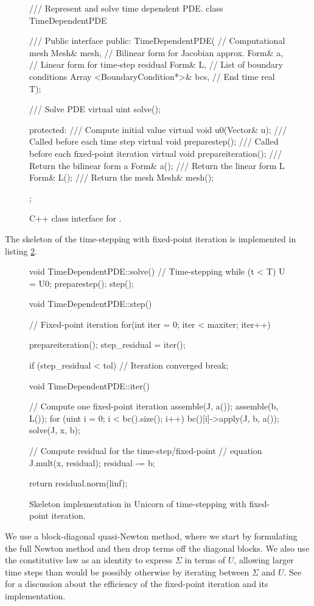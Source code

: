 \begin{figure}
\bwfig
\begin{c++}
/// Represent and solve time dependent PDE.
class TimeDependentPDE
{
  /// Public interface
public:
  TimeDependentPDE(
   // Computational mesh
   Mesh& mesh,
   // Bilinear form for Jacobian approx.
   Form& a,
   // Linear form for time-step residual
   Form& L,
   // List of boundary conditions
   Array <BoundaryCondition*>& bcs,
   // End time
   real T);

  /// Solve PDE
  virtual uint solve();

protected:
  /// Compute initial value
  virtual void u0(Vector& u);
  /// Called before each time step
  virtual void preparestep();
  /// Called before each fixed-point iteration
  virtual void prepareiteration();
  /// Return the bilinear form a
  Form& a();
  /// Return the linear form L
  Form& L();
  /// Return the mesh
  Mesh& mesh();
};
\end{c++}
\caption{C++ class interface for .}
\label{code:TimeDependentPDE}
\end{figure}
The skeleton of the time-stepping with fixed-point iteration is
implemented in listing \ref{code:time-stepping}.

\begin{figure}
\bwfig
\begin{c++}
void TimeDependentPDE::solve()
{
  // Time-stepping
  while (t < T)
  {
    U = U0;
    preparestep();
    step();
  }
}

void TimeDependentPDE::step()
{
  // Fixed-point iteration
  for(int iter = 0; iter < maxiter; iter++)
  {
    prepareiteration();
    step_residual = iter();

    if (step_residual < tol)
    {
      // Iteration converged
      break;
    }
  }
}

void TimeDependentPDE::iter()
{
  // Compute one fixed-point iteration
  assemble(J, a());
  assemble(b, L());
  for (uint i = 0; i < bc().size(); i++)
    bc()[i]->apply(J, b, a());
  solve(J, x, b);

  // Compute residual for the time-step/fixed-point
  // equation
  J.mult(x, residual);
  residual -= b;

  return residual.norm(linf);
}
\end{c++}
\caption{Skeleton implementation in Unicorn of time-stepping with
fixed-point iteration.}
\label{code:time-stepping}
\end{figure}

We use a block-diagonal quasi-Newton method, where we start by
formulating the full Newton method and then drop terms off the
diagonal blocks. We also use the constitutive law as an identity to
express $\Sigma$ in terms of $U$, allowing larger time steps than
would be possibly otherwise by iterating between $\Sigma$ and $U$.
See \citet{Jansson2009} for a discussion about the efficiency of the
fixed-point iteration and its implementation.

